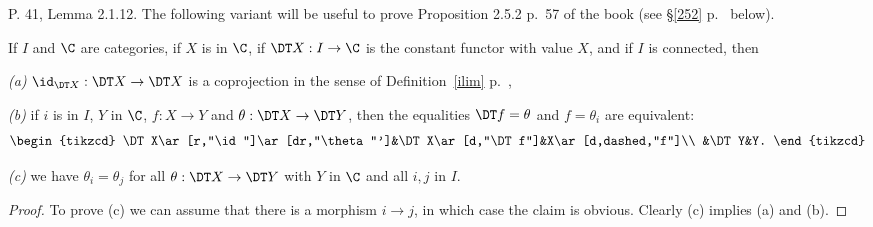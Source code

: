 \documentclass[12pt]{article}
\theoremstyle{remark}
\theoremstyle{definition}
\begin{document}
%

\begin{s}
P. 41, Lemma 2.1.12. The following variant will be useful to prove Proposition 2.5.2 p.~57 of the book (see \S\ref{252} p.~ below).

\begin{lem}
If $I$ and $\C$ are categories, if $X$ is in $\C$, if $\DT X:I\to\C$ is the constant functor with value $X$, and if $I$ is connected, then 

\nn\emph{(a)} $\id_{\DT X}:\DT X\to\DT X$ is a coprojection in the sense of Definition~\ref{ilim} p.~,

\nn\emph{(b)} if $i$ is in $I$, $Y$ in $\C$, $f:X\to Y$ and $\theta:\DT X\to\DT Y$, then the equalities $\DT f=\theta$ and $f=\theta_i$ are equivalent: 
$$
\begin{tikzcd}
\DT X\ar[r,"\id"]\ar[dr,"\theta"']&\DT X\ar[d,"\DT f"]&X\ar[d,dashed,"f"]\\ 
&\DT Y&Y.
\end{tikzcd}
$$

\nn\emph{(c)} we have $\theta_i=\theta_j$ for all $\theta:\DT X\to\DT Y$ with $Y$ in $\C$ and all $i,j$ in $I$.
\end{lem}

\begin{proof}
To prove (c) we can assume that there is a morphism $i\to j$, in which case the claim is obvious. Clearly (c) implies (a) and (b).
\end{proof}
\end{s}

%
\end{document}
